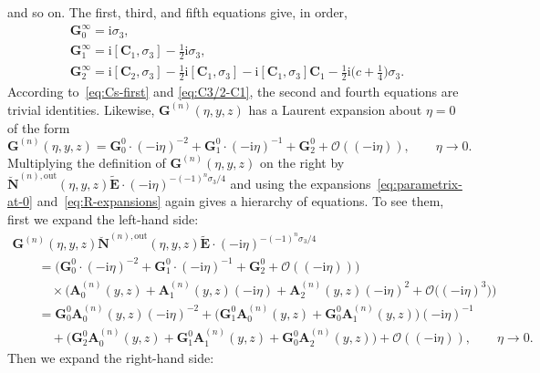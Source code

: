 \documentclass[pdftex]{sigma}
\numberwithin{equation}{section}
\begin{document}
and so on. The first, third, and fifth equations give, in order,
\begin{gather*}
\mathbf{G}_0^\infty=\mathrm{i}\sigma_3,\\
\mathbf{G}_1^\infty=\mathrm{i}[\mathbf{C}_1,\sigma_3]-\tfrac{1}{2}\mathrm{i}\sigma_3,\\
\mathbf{G}_2^\infty=\mathrm{i}[\mathbf{C}_2,\sigma_3]-\tfrac{1}{2}\mathrm{i}[\mathbf{C}_1,\sigma_3]-\mathrm{i}[\mathbf{C}_1,\sigma_3]\mathbf{C}_1-\tfrac{1}{2}\mathrm{i}\bigl(c+\tfrac{1}{4}\bigr)\sigma_3.
\end{gather*}
According to~\eqref{eq:Cs-first} and \eqref{eq:C3/2-C1}, the second and fourth equations are trivial identities. Likewise, $\mathbf{G}^{(n)}(\eta,y,z)$ has a Laurent expansion about $\eta=0$ of the form
\begin{equation*}
\mathbf{G}^{(n)}(\eta,y,z)=\mathbf{G}^0_0\cdot (-\mathrm{i}\eta)^{-2} +\mathbf{G}^0_1\cdot (-\mathrm{i}\eta)^{-1} + \mathbf{G}^0_2 + \mathcal{O}((-\mathrm{i}\eta)),\qquad\eta\to 0.
\end{equation*}
Multiplying the definition of $\mathbf{G}^{(n)}(\eta,y,z)$ on the right by $\breve{\mathbf{N}}^{(n),\mathrm{out}}(\eta,y,z)\widetilde{\mathbf{E}}\cdot(-\mathrm{i}\eta)^{-(-1)^n\sigma_3/4}$ and using the expansions~\eqref{eq:parametrix-at-0} and~\eqref{eq:R-expansions} again gives a hierarchy of equations. To see them, first we expand the left-hand side:
\begin{gather*}
\mathbf{G}^{(n)}(\eta,y,z)\breve{\mathbf{N}}^{(n),\mathrm{out}}(\eta,y,z)\widetilde{\mathbf{E}}\cdot(-\mathrm{i}\eta)^{-(-1)^n\sigma_3/4}\\
\qquad{}=\bigl(\mathbf{G}^0_0\cdot (-\mathrm{i}\eta)^{-2} +\mathbf{G}^0_1\cdot (-\mathrm{i}\eta)^{-1} + \mathbf{G}^0_2 + \mathcal{O}((-\mathrm{i}\eta))\bigr)\\
\qquad\quad{}\times\bigl(\mathbf{A}_0^{(n)}(y,z) + \mathbf{A}_1^{(n)}(y,z)(-\mathrm{i}\eta) + \mathbf{A}_2^{(n)}(y,z)(-\mathrm{i}\eta)^2 + \mathcal{O}\bigl((-\mathrm{i}\eta)^3\bigr)\bigr)\\
\qquad{}=\mathbf{G}_0^0\mathbf{A}_0^{(n)}(y,z)(-\mathrm{i}\eta)^{-2} + \bigl(\mathbf{G}_1^0\mathbf{A}_0^{(n)}(y,z) + \mathbf{G}_0^0\mathbf{A}_1^{(n)}(y,z)\bigr)(-\mathrm{i}\eta)^{-1} \\
\qquad\quad{}+
\bigl(\mathbf{G}_2^0\mathbf{A}_0^{(n)}(y,z) + \mathbf{G}_1^0\mathbf{A}_1^{(n)}(y,z) + \mathbf{G}_0^0\mathbf{A}_2^{(n)}(y,z)\bigr) + \mathcal{O}((-\mathrm{i}\eta)),\qquad\eta\to 0.
\end{gather*}
Then we expand the right-hand side:
\end{document}
